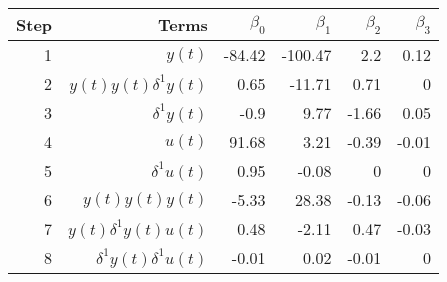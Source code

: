 \begin{tabular}{rrrrrr}
Step & Terms & $\beta_{0}$ & $\beta_{1}$ & $\beta_{2}$ & $\beta_{3}$ \\ 
\hline 
1 & $y(t)$ & -84.42 & -100.47 & 2.2 & 0.12 \\ 
2 & $y(t)y(t)\delta^1 y(t)$ & 0.65 & -11.71 & 0.71 & 0 \\ 
3 & $\delta^1 y(t)$ & -0.9 & 9.77 & -1.66 & 0.05 \\ 
4 & $u(t)$ & 91.68 & 3.21 & -0.39 & -0.01 \\ 
5 & $\delta^1 u(t)$ & 0.95 & -0.08 & 0 & 0 \\ 
6 & $y(t)y(t)y(t)$ & -5.33 & 28.38 & -0.13 & -0.06 \\ 
7 & $y(t)\delta^1 y(t)u(t)$ & 0.48 & -2.11 & 0.47 & -0.03 \\ 
8 & $\delta^1 y(t)\delta^1 u(t)$ & -0.01 & 0.02 & -0.01 & 0 \\ 
\hline 
\end{tabular}
